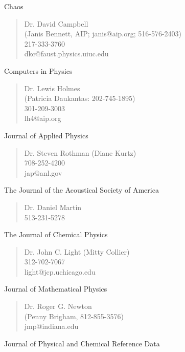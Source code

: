 \noindent      Chaos

\begin{verse}
             Dr. David Campbell\\
             (Janis Bennett, AIP; janis@aip.org; 516-576-2403)\\
             217-333-3760\\
             dkc@faust.physics.uiuc.edu
\end{verse}

\noindent      Computers in Physics

\begin{verse}
             Dr. Lewis Holmes\\
             (Patricia Daukantas: 202-745-1895)\\
             301-209-3003\\
             lh4@aip.org
\end{verse}

\noindent      Journal of Applied Physics

\begin{verse}
             Dr. Steven Rothman (Diane Kurtz)\\
             708-252-4200\\
             jap@anl.gov
\end{verse}

\noindent      The Journal of the Acoustical Society of America

\begin{verse}
             Dr. Daniel Martin\\
             513-231-5278
\end{verse}

\noindent      The Journal of Chemical Physics

\begin{verse}
             Dr. John C. Light (Mitty Collier)\\
             312-702-7067\\
             light@jcp.uchicago.edu
\end{verse}


\noindent      Journal of Mathematical Physics

\begin{verse}
             Dr. Roger G. Newton\\
             (Penny Brigham, 812-855-3576)\\
             jmp@indiana.edu
\end{verse}

\noindent    Journal of Physical and Chemical Reference Data

